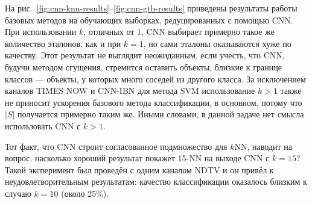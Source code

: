 На рис.~\ref{fig:cnn-knn-results}--\ref{fig:cnn-gtb-results} приведены результаты работы базовых методов на обучающих выборках, редуцированных с помощью CNN. При использовании \(k\), отличных от 1, CNN выбирает примерно такое же количество эталонов, как и при \(k=1\), но сами эталоны оказываются хуже по качеству. Этот результат не выглядит неожиданным, если учесть, что CNN, будучи методом сгущения, стремится оставить объекты, близкие к границе классов --- объекты, у которых много соседей из другого класса. За исключением каналов TIMES NOW и CNN-IBN для метода SVM использование \(k>1\) также не приносит ускорения базового метода классификации, в основном, потому что \(\left|S\right|\) получается примерно таким же. Иными словами, в данной задаче нет смысла использовать CNN с \(k>1\).

Тот факт, что CNN строит согласованное подмножество для \(k\)NN, наводит на вопрос: насколько хороший результат покажет 15-NN на выходе CNN с \(k=15\)? Такой эксперимент был проведён с одним каналом NDTV и он привёл к неудовлетворительным результатам: качество классификации оказалось близким к случаю \(k=10\) (около 25\%).

